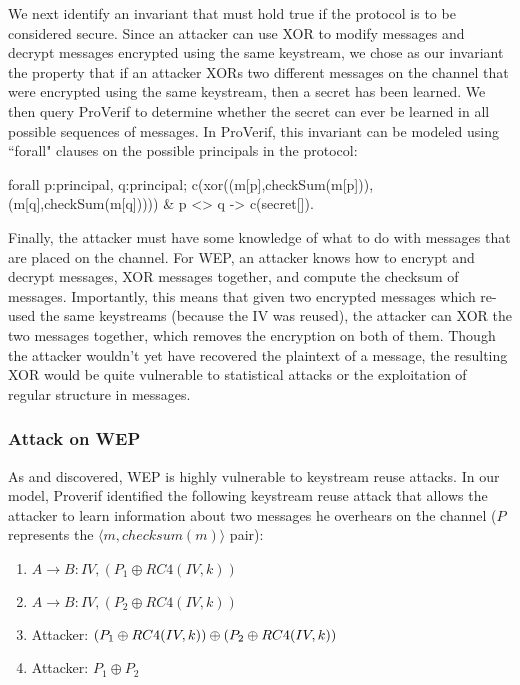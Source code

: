 \documentclass[11pt, twocolumn]{article} %
\begin{document}
{We next identify an invariant that must hold true if the protocol is to be considered secure.  Since an attacker can use XOR to modify messages and decrypt messages encrypted using the same keystream, we chose as our invariant the property that if an attacker XORs two different messages on the channel that were encrypted using the same keystream, then a secret has been learned.  We then query ProVerif to determine whether the secret can ever be learned in all possible sequences of messages.  In ProVerif, this invariant can be modeled using ``forall" clauses on the possible principals in the protocol:

\begin{verbatimtab}[4] 
forall p:principal, q:principal; 
	c(xor((m[p],checkSum(m[p])),
		(m[q],checkSum(m[q])))) 
			& p <> q -> c(secret[]).
\end{verbatimtab}

Finally, the attacker must have some knowledge of what to do with messages that are placed on the channel.  For WEP, an attacker knows how to encrypt and decrypt messages, XOR messages together, and compute the checksum of messages.  Importantly, this means that given two encrypted messages which re-used the same keystreams (because the IV was reused), the attacker can XOR the two messages together, which removes the encryption on both of them.  Though the attacker wouldn't yet have recovered the plaintext of a message, the resulting XOR would be quite vulnerable to statistical attacks or the exploitation of regular structure in messages.
\subsubsection{Attack on WEP}
As \cite{lafourcade10} and \cite{borisov01} discovered, WEP is highly vulnerable to keystream reuse attacks.  In our model, Proverif identified the following keystream reuse attack that allows the attacker to learn information about two messages he overhears on the channel ($P$ represents the $\langle m, checksum(m)\rangle$ pair):

\begin{enumerate}
\item $A\rightarrow B:  IV, (P_1 \oplus RC4(IV, k))$
\item $A \rightarrow B: IV, (P_2 \oplus RC4(IV, k))$
\item Attacker: $(P_1 \oplus RC4(IV, k)) \oplus \\(P_2 \oplus RC4(IV, k))$
\item Attacker: $P_1 \oplus P_2$
\end{enumerate}

}
\end{document}
